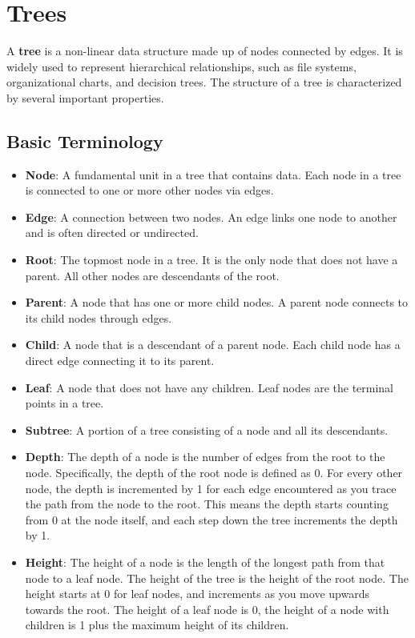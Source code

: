 \documentclass{book}
\begin{document}
\section{Trees}

A \textbf{tree} is a non-linear data structure made up of nodes connected by edges. It is widely used to represent hierarchical relationships, such as file systems, organizational charts, and decision trees. The structure of a tree is characterized by several important properties.

\subsection{Basic Terminology}

\begin{itemize}
    \item \textbf{Node}: A fundamental unit in a tree that contains data. Each node in a tree is connected to one or more other nodes via edges.
    \item \textbf{Edge}: A connection between two nodes. An edge links one node to another and is often directed or undirected.
    \item \textbf{Root}: The topmost node in a tree. It is the only node that does not have a parent. All other nodes are descendants of the root.
    \item \textbf{Parent}: A node that has one or more child nodes. A parent node connects to its child nodes through edges.
    \item \textbf{Child}: A node that is a descendant of a parent node. Each child node has a direct edge connecting it to its parent.
    \item \textbf{Leaf}: A node that does not have any children. Leaf nodes are the terminal points in a tree.
    \item \textbf{Subtree}: A portion of a tree consisting of a node and all its descendants.
    \item \textbf{Depth}: The depth of a node is the number of edges from the root to the node. Specifically, the depth of the root node is defined as 0. For every other node, the depth is incremented by 1 for each edge encountered as you trace the path from the node to the root. This means the depth starts counting from 0 at the node itself, and each step down the tree increments the depth by 1.
    \item \textbf{Height}: The height of a node is the length of the longest path from that node to a leaf node. The height of the tree is the height of the root node. The height starts at 0 for leaf nodes, and increments as you move upwards towards the root. The height of a leaf node is 0, the height of a node with children is 1 plus the maximum height of its children.

\end{itemize}
\end{document}

